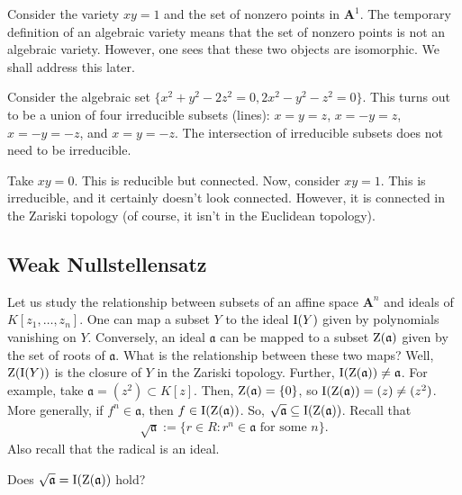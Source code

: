 \documentclass [11 pt, oneside] {article}
\begin{document}
\begin{example}[ ]\label{}
Consider the variety $xy=1$ and the set of nonzero points in $\mathbf{A}^1$. The temporary definition of an algebraic variety means that the set of nonzero points is not an algebraic variety. However, one sees that these two objects are isomorphic. We shall address this later.
\end{example}

\begin{example}[ ]\label{}
Consider the algebraic set $\{x^2+y^2 -2z^2=0, 2x^2 - y^2 - z^2=0\}$. This turns out to be a union of four irreducible subsets (lines): $x=y=z$, $x=-y=z$, $x=-y=-z$, and $x=y=-z$. The intersection of irreducible subsets does not need to be irreducible.
\end{example}

\begin{example}[ ]\label{}
Take $xy=0$. This is reducible but connected. Now, consider $xy=1$. This is irreducible, and it certainly doesn't look connected. However, it is connected in the Zariski topology (of course, it isn't in the Euclidean topology).
\end{example}


\subsection{Weak Nullstellensatz}
Let us study the relationship between subsets of an affine space $\mathbf{A}^n$ and ideals of $K[z_1,\hdots, z_n]$. One can map a subset $Y$ to the ideal $\operatorname{I}(Y)$ given by polynomials vanishing on $Y$. Conversely, an ideal $\mathfrak{a}$ can be mapped to a subset $\operatorname{Z}(\mathfrak a)$ given by the set of roots of $\mathfrak{a}$. What is the relationship between these two maps? Well, $\operatorname{Z}(\operatorname{I}(Y))$ is the closure of $Y$ in the Zariski topology. Further, $\operatorname{I}(\operatorname{Z}(\mathfrak{a}))\ne \mathfrak{a}$. For example, take $\mathfrak{a}=(z^2)\subset K[z]$. Then, $\operatorname{Z}(\mathfrak{a}) = \{0\}$, so $\operatorname{I}(\operatorname{Z}(\mathfrak{a})) =(z)\ne (z^2)$. More generally, if $f^n\in \mathfrak{a}$, then $f\in \operatorname{I}(\operatorname{Z}(\mathfrak a))$. So, $\sqrt{\mathfrak{a}} \subseteq \operatorname{I}(\operatorname{Z}(\mathfrak{a}))$. Recall that
\begin{align*}
	\sqrt{\mathfrak{a}} := \{ r\in R : r^n \in \mathfrak{a} \textrm{ for some $n$}\}.
\end{align*}
Also recall that the radical is an ideal.

\begin{problem}
	Does $\sqrt{\mathfrak{a}}= \operatorname{I}(\operatorname{Z}(\mathfrak{a})) $ hold?
\end{problem}
\end{document}
